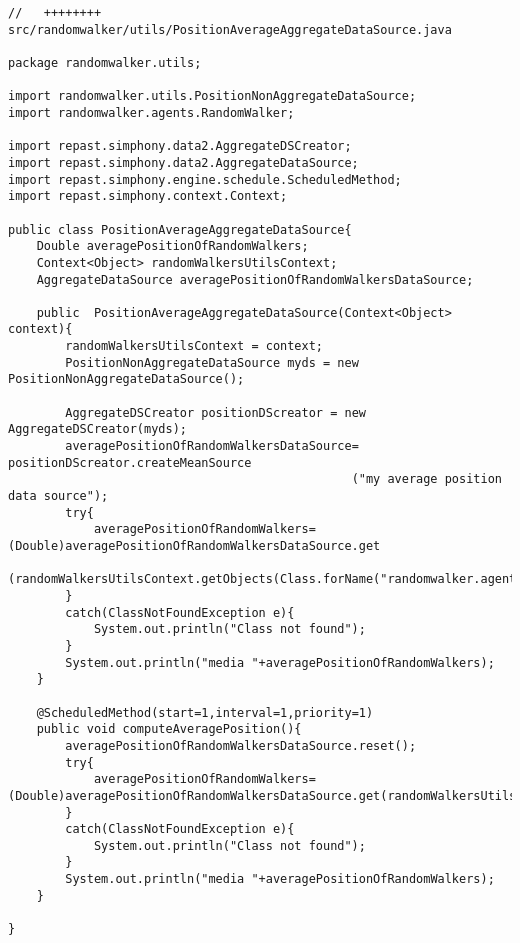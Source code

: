 \documentclass{article}
\begin{document}
\begin{verbatim}
//   ++++++++ src/randomwalker/utils/PositionAverageAggregateDataSource.java

package randomwalker.utils;

import randomwalker.utils.PositionNonAggregateDataSource;
import randomwalker.agents.RandomWalker;

import repast.simphony.data2.AggregateDSCreator;
import repast.simphony.data2.AggregateDataSource;
import repast.simphony.engine.schedule.ScheduledMethod;
import repast.simphony.context.Context;

public class PositionAverageAggregateDataSource{
	Double averagePositionOfRandomWalkers;
	Context<Object> randomWalkersUtilsContext;
	AggregateDataSource averagePositionOfRandomWalkersDataSource;

	public  PositionAverageAggregateDataSource(Context<Object> context){
		randomWalkersUtilsContext = context;
		PositionNonAggregateDataSource myds = new PositionNonAggregateDataSource();

		AggregateDSCreator positionDScreator = new AggregateDSCreator(myds);
		averagePositionOfRandomWalkersDataSource= positionDScreator.createMeanSource
		                                        ("my average position data source");
		try{
			averagePositionOfRandomWalkers=(Double)averagePositionOfRandomWalkersDataSource.get
			  (randomWalkersUtilsContext.getObjects(Class.forName("randomwalker.agents.RandomWalker")),0);
		}
		catch(ClassNotFoundException e){
			System.out.println("Class not found");
		}
		System.out.println("media "+averagePositionOfRandomWalkers);
	}

	@ScheduledMethod(start=1,interval=1,priority=1)
	public void computeAveragePosition(){
		averagePositionOfRandomWalkersDataSource.reset();
		try{
			averagePositionOfRandomWalkers=(Double)averagePositionOfRandomWalkersDataSource.get(randomWalkersUtilsContext.getObjects(Class.forName("randomwalker.agents.RandomWalker")),0);
		}
		catch(ClassNotFoundException e){
			System.out.println("Class not found");
		}
		System.out.println("media "+averagePositionOfRandomWalkers);
	}

}
\end{verbatim}
\end{document}
